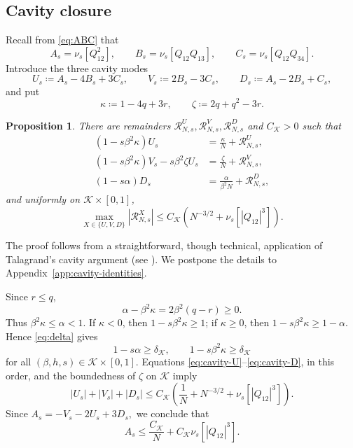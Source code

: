 \documentclass[11pt]{article}
\newtheorem{proposition}[theorem]{Proposition}
\numberwithin{equation}{section}
\newcommand{\1}{\mathbf 1}
\newcommand{\cK}{\mathcal K}
\begin{document}
\subsection{Cavity closure}\label{sec:cavityclosure}

Recall from \eqref{eq:ABC} that
\[
 A_s=\nu_s[Q_{12}^2],\qquad
 B_s=\nu_s[Q_{12}Q_{13}],\qquad
 C_s=\nu_s[Q_{12}Q_{34}].
\]
Introduce the three cavity modes
\begin{equation}
 U_s\coloneqq A_s-4B_s+3C_s,\qquad
 V_s\coloneqq2B_s-3C_s,\qquad
 D_s\coloneqq A_s-2B_s+C_s,
 \label{eq:cavity-modes}
\end{equation}
and put
\begin{equation}
 \kappa \coloneqq1-4q+3r,
 \qquad
 \zeta\coloneqq2q+q^2-3r.
 \label{eq:cavity-parameters}
\end{equation}

\begin{proposition}
\label{prop:cavity}
There are remainders
$\mathcal R^U_{N,s},\mathcal R^V_{N,s},\mathcal R^D_{N,s}$ and $C_\cK>0$ such that
\begin{align}
 (1-s\beta^2\kappa )U_s
 &=\frac{\kappa }N+\mathcal R^U_{N,s},
 \label{eq:cavity-U}\\
 (1-s\beta^2\kappa )V_s-s\beta^2\zeta U_s
 &=\frac{\zeta}N+\mathcal R^V_{N,s},
 \label{eq:cavity-V}\\
 (1-s\alpha)D_s
 &=\frac{\alpha}{\beta^2N}+\mathcal R^D_{N,s},
 \label{eq:cavity-D}
\end{align}
and uniformly on $\cK\times[0,1]$,
\begin{equation}
 \max_{X\in\{U,V,D\}}|\mathcal R^X_{N,s}|
 \le C_{\cK}(N^{-3/2}+\nu_s[|Q_{12}|^3]).
 \label{eq:cavity-remainders}
\end{equation}
\end{proposition}

The proof follows from a straightforward, though technical, application of Talagrand's cavity argument (see \cite[Chapter~1]{Talagrand}). We postpone the details to Appendix~\ref{app:cavity-identities}.

Since $r\le q$,
\[
 \alpha-\beta^2\kappa
 =
 2\beta^2(q-r)\ge0.
\]
Thus $\beta^2\kappa \le\alpha<1$.  If $\kappa <0$, then
$1-s\beta^2\kappa \ge1$; if $\kappa \ge0$, then
$1-s\beta^2\kappa \ge1-\alpha$.  Hence \eqref{eq:delta} gives
\begin{equation}
 1-s\alpha\ge \delta _{\cK},
 \qquad
 1-s\beta^2\kappa \ge \delta _{\cK}
 \label{eq:denominator-bounds}
\end{equation}
for all $(\beta,h,s)\in\cK\times[0,1]$.
Equations \eqref{eq:cavity-U}--\eqref{eq:cavity-D}, in this order,
and the boundedness of $\zeta$ on $\cK$ imply
\[
 |U_s|+|V_s|+|D_s|
 \le C_{\cK}\left(\frac1N+N^{-3/2}+\nu_s[|Q_{12}|^3]\right).
\]
Since
$
 A_s=-V_s-2U_s+3D_s,
$ 
we conclude that
\begin{equation}
 A_s\le \frac{C_{\cK}}N
 +C_{\cK}\nu_s[|Q_{12}|^3].
 \label{eq:preabsorb}
\end{equation}
\end{document}
